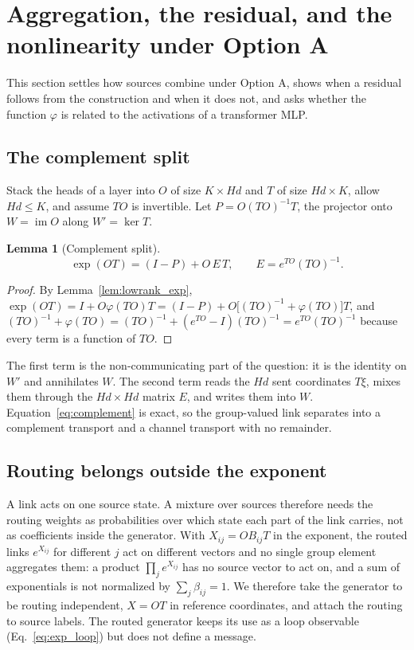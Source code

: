 \documentclass[11pt]{article}
\newtheorem{lemma}[proposition]{Lemma}
\theoremstyle{definition}
\theoremstyle{remark}
\newcommand{\im}{\operatorname{im}}
\begin{document}
\section{Aggregation, the residual, and the nonlinearity under Option A}
\label{sec:aggregation}

This section settles how sources combine under Option A, shows when a residual follows from the construction and when it does not, and asks whether the function $\varphi$ is related to the activations of a transformer MLP.

\subsection{The complement split}

Stack the heads of a layer into $O$ of size $K\times Hd$ and $T$ of size $Hd\times K$, allow $Hd\le K$, and assume $TO$ is invertible. Let $P=O(TO)^{-1}T$, the projector onto $W=\im O$ along $W'=\ker T$.

\begin{lemma}[Complement split]
\label{lem:complement}
\begin{equation}
\exp(OT)=(I-P)+O\,E\,T,\qquad E=e^{TO}(TO)^{-1}.
\label{eq:complement}
\end{equation}
\end{lemma}

\begin{proof}
By Lemma~\ref{lem:lowrank_exp}, $\exp(OT)=I+O\varphi(TO)T=(I-P)+O\big[(TO)^{-1}+\varphi(TO)\big]T$, and $(TO)^{-1}+\varphi(TO)=(TO)^{-1}+(e^{TO}-I)(TO)^{-1}=e^{TO}(TO)^{-1}$ because every term is a function of $TO$.
\end{proof}

The first term is the non-communicating part of the question: it is the identity on $W'$ and annihilates $W$. The second term reads the $Hd$ sent coordinates $T\xi$, mixes them through the $Hd\times Hd$ matrix $E$, and writes them into $W$. Equation~\eqref{eq:complement} is exact, so the group-valued link separates into a complement transport and a channel transport with no remainder.

\subsection{Routing belongs outside the exponent}

A link acts on one source state. A mixture over sources therefore needs the routing weights as probabilities over which state each part of the link carries, not as coefficients inside the generator. With $X_{ij}=OB_{ij}T$ in the exponent, the routed links $e^{X_{ij}}$ for different $j$ act on different vectors and no single group element aggregates them: a product $\prod_je^{X_{ij}}$ has no source vector to act on, and a sum of exponentials is not normalized by $\sum_j\beta_{ij}=1$. We therefore take the generator to be routing independent, $X=OT$ in reference coordinates, and attach the routing to source labels. The routed generator keeps its use as a loop observable (Eq.~\eqref{eq:exp_loop}) but does not define a message.
\end{document}
